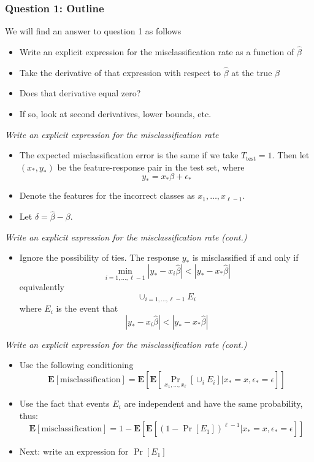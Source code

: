 \documentclass{beamer}
\newcommand{\E}{\textbf{E}}
\begin{document}
\begin{frame}
\frametitle{Question 1: Outline}
We will find an answer to question 1 as follows
\begin{itemize}
\item
Write an explicit expression for the misclassification rate as a function of $\hat{\beta}$
\item
Take the derivative of that expression with respect to $\hat{\beta}$ at the true $\beta$
\item
Does that derivative equal zero?
\item
If so, look at second derivatives, lower bounds, etc.
\end{itemize}
\end{frame}

\begin{frame}
\emph{Write an explicit expression for the misclassification rate}
\begin{itemize}
\item
The expected misclassification error is the same if we take $T_{\text{test}} = 1$.
Then let $(x_*, y_*)$ be the feature-response pair in the test set, where
\[
y_* = x_* \beta + \epsilon_*
\]
\item
Denote the features for the incorrect classes as $x_1, \hdots, x_{\ell -1}$.
\item
Let $\delta = \hat{\beta} - \beta$.
\end{itemize}
\end{frame}

\begin{frame}
\emph{Write an explicit expression for the misclassification rate (cont.)}
\begin{itemize}
\item Ignore the possibility of ties.
The response $y_*$ is misclassified if and only if
\[
\min_{i=1,\hdots, \ell-1} |y_* -  x_i \hat{\beta}| < |y_* - x_*\hat{\beta}|
\]
equivalently
\[
\cup_{i=1,\hdots, \ell-1} E_i
\]
where $E_i$ is the event that
\[
|y_* -  x_i \hat{\beta}| < |y_* - x_*\hat{\beta}|
\]
\end{itemize}
\end{frame}

\begin{frame}
\emph{Write an explicit expression for the misclassification rate (cont.)}
\begin{itemize}
\item
Use the following conditioning
\[
\E[\text{misclassification}] = \E[\E[\Pr_{x_1,\hdots,x_\ell}[\cup_i E_i] | x_* = x, \epsilon_* = \epsilon]]
\]
\item
Use the fact that events $E_i$ are independent and have the same probability, thus:
\[
\E[\text{misclassification}] = 1- \E[\E[ (1- \Pr[E_1])^{\ell - 1} | x_* = x, \epsilon_* = \epsilon]]
\]
\item
Next: write an expression for $\Pr[E_1]$
\end{itemize}
\end{frame}
\end{document}

